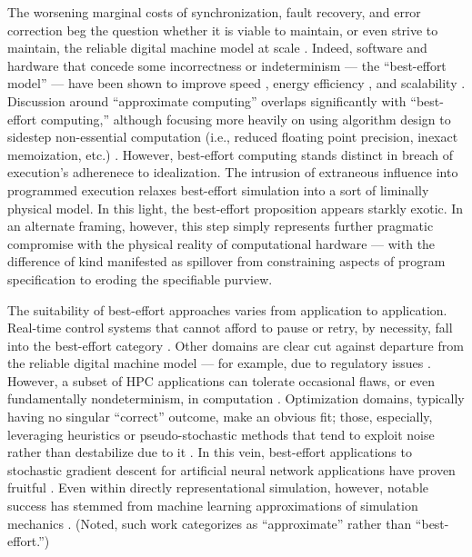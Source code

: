 The worsening marginal costs of synchronization, fault recovery, and error correction beg the question whether it is viable to maintain, or even strive to maintain, the reliable digital machine model at scale \citep{dongarra2014applied}.
Indeed, software and hardware that concede some incorrectness or indeterminism --- the ``best-effort model'' --- have been shown to improve speed \citep{chakrapani2008probabilistic}, energy efficiency \citep{chakrapani2008probabilistic,bocquet2018memory}, and scalability \citep{meng2009best}.
Discussion around ``approximate computing'' overlaps significantly with ``best-effort computing,'' although focusing more heavily on using algorithm design to sidestep non-essential computation (i.e., reduced floating point precision, inexact memoization, etc.) \citep{mittal2016survey}.
However, best-effort computing stands distinct in breach of execution's adherenece to idealization.
The intrusion of extraneous influence into programmed execution relaxes best-effort simulation into a sort of liminally physical model.
In this light, the best-effort proposition appears starkly exotic.
In an alternate framing, however, this step simply represents further pragmatic compromise with the physical reality of computational hardware --- with the difference of kind manifested as spillover from constraining aspects of program specification to eroding the specifiable purview.

The suitability of best-effort approaches varies from application to application.
Real-time control systems that cannot afford to pause or retry, by necessity, fall into the best-effort category \citep{rahmati2011computing, rhodes2020real}.
Other domains are clear cut against departure from the reliable digital machine model --- for example, due to regulatory issues \citep{dongarra2014applied}.
However, a subset of HPC applications can tolerate occasional flaws, or even fundamentally nondeterminism, in computation \citep{chakradhar2010best}.
Optimization domains, typically having no singular ``correct'' outcome, make an obvious fit;
those, especially, leveraging heuristics or pseudo-stochastic methods that tend to exploit noise rather than destabilize due to it \citep{chakrapani2008probabilistic,chakradhar2010best}.
In this vein, best-effort applications to stochastic gradient descent for artificial neural network applications have proven fruitful \citep{dean2012large,zhao2019elastic,niu2011hogwild,noel2014dogwild,rhodes2020real}.
Even within directly representational simulation, however, notable success has stemmed from machine learning approximations of simulation mechanics \citep{behler2007generalized,kochkov2021machine}.
(Noted, such work categorizes as ``approximate'' rather than ``best-effort.'')

